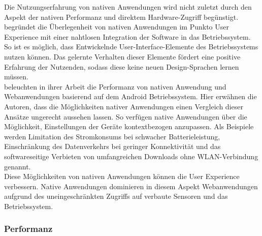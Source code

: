 \documentclass[a4paper]{scrartcl}
\begin{document}
Die Nutzungserfahrung von nativen Anwendungen wird nicht zuletzt durch den Aspekt der nativen Performanz und direktem Hardware-Zugriff begünstigt. \textcite[28]{Jobe} begründet die Überlegenheit von nativen Anwendungen im Punkto User Experience mit einer nahtlosen Integration der Software in das Betriebssystem. So ist es möglich, dass Entwickelnde User-Interface-Elemente des Betriebssystems nutzen können. Das gelernte Verhalten dieser Elemente fördert eine positive Erfahrung der Nutzenden, sodass diese keine neuen Design-Sprachen lernen müssen. \\
\textcite[1001]{native_vs_web} beleuchten in ihrer Arbeit die Performanz von nativen Anwendung und Webanwendungen basierend auf dem Android Betriebssystem. Hier erwähnen die Autoren, dass die Möglichkeiten nativer Anwendungen einen Vergleich dieser Ansätze ungerecht aussehen lassen. So verfügen native Anwendungen über die Möglichkeit, Einstellungen der Geräte kontextbezogen anzupassen. Als Beispiele werden Limitation des Stromkonsums bei schwacher Batterieleistung, Einschränkung des Datenverkehrs bei geringer Konnektivität und das softwareseitige Verbieten von umfangreichen Downloads ohne WLAN-Verbindung genannt. \\
Diese Möglichkeiten von nativen Anwendungen können die User Experience verbessern. Native Anwendungen dominieren in diesem Aspekt Webanwendungen aufgrund des uneingeschränkten Zugriffs auf verbaute Sensoren und das Betriebssystem.

\subsubsection{Performanz}
\end{document}
